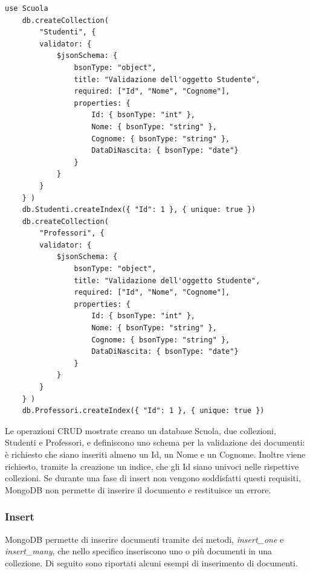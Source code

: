 \documentclass{article}
\begin{document}
    \begin{lstlisting}[language=MongoDBShell, caption={Esempio di operazioni CRUD in MongoDB Shell}]
    use Scuola
    db.createCollection(
        "Studenti", {
        validator: {
            $jsonSchema: {
                bsonType: "object",
                title: "Validazione dell'oggetto Studente",
                required: ["Id", "Nome", "Cognome"],
                properties: {
                    Id: { bsonType: "int" },
                    Nome: { bsonType: "string" },
                    Cognome: { bsonType: "string" },
                    DataDiNascita: { bsonType: "date"}
                }
            }
        }
    } )
    db.Studenti.createIndex({ "Id": 1 }, { unique: true })
    db.createCollection(
        "Professori", {
        validator: {
            $jsonSchema: {
                bsonType: "object",
                title: "Validazione dell'oggetto Studente",
                required: ["Id", "Nome", "Cognome"],
                properties: {
                    Id: { bsonType: "int" },
                    Nome: { bsonType: "string" },
                    Cognome: { bsonType: "string" },
                    DataDiNascita: { bsonType: "date"}
                }   
            }   
        }
    } )
    db.Professori.createIndex({ "Id": 1 }, { unique: true })
    \end{lstlisting}

Le operazioni CRUD mostrate creano un database Scuola, due collezioni, Studenti e Professori, e 
definiscono uno schema per la validazione dei documenti: è richiesto che siano inseriti almeno un Id, 
un Nome e un Cognome. Inoltre viene richiesto, tramite la creazione un indice, che gli Id siano univoci
nelle rispettive collezioni. Se durante una fase di insert non vengono soddisfatti questi
requisiti, MongoDB non permette di inserire il documento e restituisce un errore.

\subsubsection{Insert}
MongoDB permette di inserire documenti tramite dei metodi, \textit{insert\_one} e \textit{insert\_many}, che nello specifico inseriscono uno
o più documenti in una collezione. Di seguito sono riportati alcuni esempi di inserimento di documenti.
\end{document}
